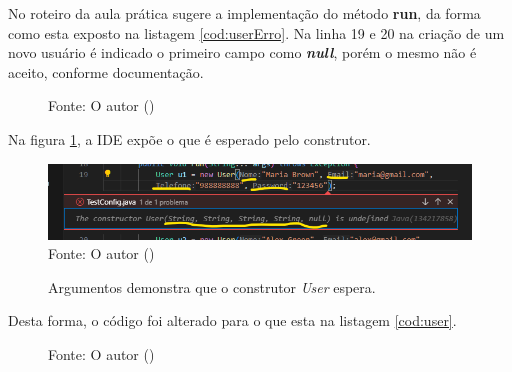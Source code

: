 \par No roteiro da aula prática sugere a implementação do método \textbf{run}, da forma como esta exposto na listagem \ref{cod:userErro}. Na linha 19 e 20 na criação de um novo usuário é indicado o primeiro campo como \textit{\textbf{null}}, porém o mesmo não é aceito, conforme documentação.

\begin{figure}[H]
  \flushleft %
    {\fontsize{10pt}{\baselineskip}\selectfont  Fonte: O autor (\the\year) }
\end{figure}

\par Na figura \ref{fig:sugconstrutor}, a IDE expõe o que é esperado pelo construtor.

\begin{figure}[H]
  \caption{Argumentos demonstra que o construtor \textit{User} espera.}
  \includegraphics[scale=0.8]{figure/user_jaova.png}
  \label{fig:sugconstrutor}
  \flushleft %
  {\fontsize{10pt}{\baselineskip}\selectfont  Fonte: O autor (\the\year) }
\end{figure}
\par Desta forma, o código foi alterado para o que esta na listagem \ref{cod:user}.


\begin{figure}[H]
  \flushleft %
  {\fontsize{10pt}{\baselineskip}\selectfont  Fonte: O autor (\the\year) }
\end{figure}



